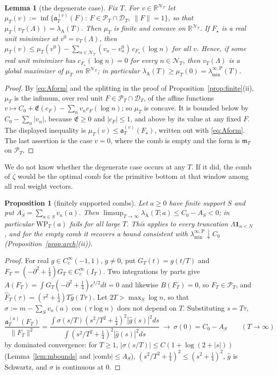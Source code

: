 \documentclass[11pt]{amsart}
\newtheorem{proposition}[theorem]{Proposition}
\newtheorem{lemma}[theorem]{Lemma}
\theoremstyle{definition}
\theoremstyle{remark}
\newcommand{\R}{\mathbb R}
\newcommand{\PT}{\mathcal P_T}
\newcommand{\IT}{I_T}
\newcommand{\lamA}{\lambda_{\mathrm A}(T)}
\newcommand{\Fh}{\widehat F}
\newcommand{\cF}{c_F}
\newcommand{\Lev}{\mathfrak E}
\newcommand{\NT}{\mathcal N_T}
\newcommand{\mT}{\mathfrak m_T}
\newcommand{\laminfP}{\lambda^{\infty,\mathrm P}_{\min}}
\begin{document}
\begin{lemma}[the degenerate case]\label{lem:degen}
Fix $T$. For $v\in\R^{\NT}$ let
$\mu_T(v):=\inf\{\mathfrak a^{(v)}_T(F):\ F\in\PT\cap\mathcal D_T,\ \|F\|=1\}$, so that
$\mu_T(v_T(\Lambda))=\lamA$. Then $\mu_T$ is finite and concave on $\R^{\NT}$. If $F_\star$ is a real unit
minimizer at $v^0=v_T(\Lambda)$, then
$\mu_T(v)\le\mu_T(v^0)-\sum_{n\in\NT}(v_n-v^0_n)\,c_{F_\star}(\log n)$ for all $v$. Hence, if some real unit
minimizer has $c_{F_\star}(\log n)=0$ for every $n\in\NT$, then $v_T(\Lambda)$ is a global maximizer of
$\mu_T$ on $\R^{\NT}$; in particular $\lamA\ge\mu_T(0)=\laminfP(T)$.
\end{lemma}
\begin{proof}
By \eqref{eq:Aform} and the splitting in the proof of Proposition~\ref{prop:finite}(ii), $\mu_T$ is the
infimum, over real unit $F\in\PT\cap\mathcal D_T$, of the affine functions
$v\mapsto C_0+\Lev(\cF)-\sum_nv_n\cF(\log n)$; so $\mu_T$ is concave. It is bounded below by
$C_0-\sum_n|v_n|$, because $\Lev\ge0$ and $|\cF|\le1$, and above by its value at any fixed $F$. The displayed
inequality is $\mu_T(v)\le\mathfrak a^{(v)}_T(F_\star)$, written out with \eqref{eq:Aform}. The last assertion
is the case $v=0$, where the comb is empty and the form is $\mT$ on $\PT$.
\end{proof}

We do not know whether the degenerate case occurs at any $T$. If it did, the comb of $\zeta$ would be the
optimal comb for the primitive bottom at that window among all real weight vectors.


\begin{proposition}[finitely supported combs]\label{prop:finsupp}
Let $a\ge0$ have finite support $S$ and put $A_S=\sum_{n\in S}v_n(a)$. Then
$\limsup_{T\to\infty}\lambda_{\mathrm A}(T;a)\le C_0-A_S<0$; in particular $\mathrm{WP}_T(a)$ fails for all
large $T$. This applies to every truncation $\Lambda\mathbf 1_{n<N}$, and for the empty comb it recovers
a bound consistent with $\laminfP\downarrow C_0$ (Proposition~\ref{prop:arch}(ii)).
\end{proposition}
\begin{proof}
For real $g\in C_c^\infty(-1,1)$, $g\ne0$, put $G_T(t)=g(t/T)$ and $F_T=(-\partial^2+\frac14)G_T\in C_c^\infty(\IT)$.
Two integrations by parts give $A(F_T)=\int G_T(-\partial^2+\frac14)e^{t/2}dt=0$ and likewise $B(F_T)=0$, so
$F_T\in\PT$, and $\Fh_T(\tau)=(\tau^2+\frac14)T\widehat g(T\tau)$. Let $2T>\max_S\log n$, so that
$\sigma:=m-\sum_Sv_n(a)\cos(\tau\log n)$ does not depend on $T$. Substituting $s=T\tau$,
\[
\frac{\mathfrak a^{(a)}_T(F_T)}{\|F_T\|^2}=\frac{\int\sigma(s/T)(s^2/T^2+\frac14)^2|\widehat g(s)|^2ds}{\int(s^2/T^2+\frac14)^2|\widehat g(s)|^2ds}
\ \longrightarrow\ \sigma(0)=C_0-A_S\qquad(T\to\infty)
\]
by dominated convergence: for $T\ge1$, $|\sigma(s/T)|\le C(1+\log(2+|s|))$ (Lemma~\ref{lem:mbounds} and
$|\text{comb}|\le A_S$), $(s^2/T^2+\frac14)^2\le(s^2+\frac14)^2$, $\widehat g$ is Schwartz, and $\sigma$ is
continuous at $0$.
\end{proof}
\end{document}
